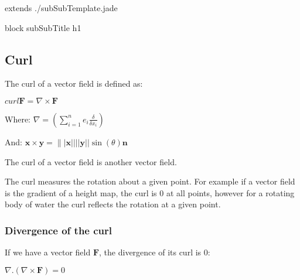 extends ./subSubTemplate.jade

block subSubTitle
	h1
\subsection{Curl}

The curl of a vector field is defined as:

\(curl \mathbf F=\nabla \times \mathbf F\)

Where: \(\nabla =(\sum_{i=1}^n e_i\frac{\delta }{\delta x_i})\)

And: \(\mathbf x\times \mathbf y=\||\mathbf x|| ||\mathbf y|| \sin(\theta )\mathbf n\)

The curl of a vector field is another vector field.

The curl measures the rotation about a given point. For example if a vector field is the gradient of a height map, the curl is \(0\) at all points, however for a rotating body of water the curl reflects the rotation at a given point.

\subsubsection{Divergence of the curl}

If we have a vector field \(\mathbf F\), the divergence of its curl is \(0\):

\(\nabla . (\nabla \times \mathbf F)=0\)

